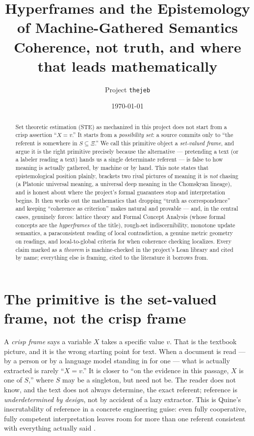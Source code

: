 \documentclass[11pt]{article}
\title{Hyperframes and the Epistemology of Machine-Gathered Semantics\\
\large Coherence, not truth, and where that leads mathematically}
\author{Project \texttt{thejeb}}
\date{\today}
\begin{document}
\maketitle

\begin{abstract}
Set theoretic estimation (STE) as mechanized in this project does not
start from a crisp assertion ``$X = v$.''  It starts from a
\emph{possibility set}: a source commits only to ``the referent is
somewhere in $S \subseteq \Xi$.''  We call this primitive object a
\emph{set-valued frame}, and argue it is the right primitive precisely
because the alternative --- pretending a text (or a labeler reading a
text) hands us a single determinate referent --- is false to how
meaning is actually gathered, by machine or by hand.  This note states
that epistemological position plainly, brackets two rival pictures of
meaning it is \emph{not} chasing (a Platonic universal meaning, a
universal deep meaning in the Chomskyan lineage), and is honest about
where the project's formal guarantees stop and interpretation begins.
It then works out the mathematics that dropping ``truth as
correspondence'' and keeping ``coherence as criterion'' makes natural
and provable --- and, in the central cases, genuinely forces: lattice
theory and Formal Concept Analysis (whose formal concepts are the
\emph{hyperframes} of the title), rough-set indiscernibility, monotone
update semantics, a paraconsistent reading of local contradiction, a
genuine metric geometry on readings, and local-to-global criteria for
when coherence checking localizes.
Every claim marked as a \emph{theorem} is machine-checked in the
project's Lean library and cited by name; everything else is framing,
cited to the literature it borrows from.
\end{abstract}

\section{The primitive is the set-valued frame, not the crisp frame}
\label{sec:primitive}

A \emph{crisp frame} says a variable $X$ takes a specific value $v$.
That is the textbook picture, and it is the wrong starting point for
text.  When a document is read --- by a person or by a language model
standing in for one --- what is actually extracted is rarely ``$X =
v$.''  It is closer to ``on the evidence in this passage, $X$ is one
of $S$,'' where $S$ may be a singleton, but need not be.  The reader
does not know, and the text does not always determine, the exact
referent; reference is \emph{underdetermined by design}, not by
accident of a lazy extractor. This is Quine's inscrutability of
reference in a concrete engineering guise: even fully cooperative,
fully competent interpretation leaves room for more than one referent
consistent with everything actually said \citep{quine1960word}.
\end{document}
